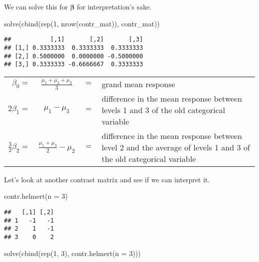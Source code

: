\documentclass[
]{book}
\newenvironment{Shaded}{\begin{snugshade}}{\end{snugshade}}
\newcommand{\AttributeTok}[1]{\textcolor[rgb]{0.77,0.63,0.00}{#1}}
\newcommand{\DecValTok}[1]{\textcolor[rgb]{0.00,0.00,0.81}{#1}}
\newcommand{\FunctionTok}[1]{\textcolor[rgb]{0.00,0.00,0.00}{#1}}
\newcommand{\NormalTok}[1]{#1}
\begin{document}
We can solve this for \(\boldsymbol{\beta}\) for interpretation's sake.

\begin{Shaded}
\begin{Highlighting}[]
\FunctionTok{solve}\NormalTok{(}\FunctionTok{cbind}\NormalTok{(}\FunctionTok{rep}\NormalTok{(}\DecValTok{1}\NormalTok{, }\FunctionTok{nrow}\NormalTok{(contr\_mat)), contr\_mat))}
\end{Highlighting}
\end{Shaded}

\begin{verbatim}
##           [,1]       [,2]       [,3]
## [1,] 0.3333333  0.3333333  0.3333333
## [2,] 0.5000000  0.0000000 -0.5000000
## [3,] 0.3333333 -0.6666667  0.3333333
\end{verbatim}

\begin{tabularx}{\textwidth}{r c c X}
\(\beta_0 =\) &\(\tfrac{\mu_1+\mu_2+\mu_3}{3}\) &\(=\) &grand mean response \\
\(2\beta_1 =\) &\(\mu_1 - \mu_3\) &\(=\) &difference in the mean response between levels 1 and 3 of the old categorical variable \\
\(\tfrac{3}{2}\beta_2 =\) &\(\tfrac{\mu_1+\mu_3}{2} - \mu_2\) &\(=\) &difference in the mean response between level 2 and the average of levels 1 and 3 of the old categorical variable
\end{tabularx}

Let's look at another contrast matrix and see if we can interpret it.

\begin{Shaded}
\begin{Highlighting}[]
\FunctionTok{contr.helmert}\NormalTok{(}\AttributeTok{n =} \DecValTok{3}\NormalTok{)}
\end{Highlighting}
\end{Shaded}

\begin{verbatim}
##   [,1] [,2]
## 1   -1   -1
## 2    1   -1
## 3    0    2
\end{verbatim}

\begin{Shaded}
\begin{Highlighting}[]
\FunctionTok{solve}\NormalTok{(}\FunctionTok{cbind}\NormalTok{(}\FunctionTok{rep}\NormalTok{(}\DecValTok{1}\NormalTok{, }\DecValTok{3}\NormalTok{), }\FunctionTok{contr.helmert}\NormalTok{(}\AttributeTok{n =} \DecValTok{3}\NormalTok{)))}
\end{Highlighting}
\end{Shaded}
\end{document}
